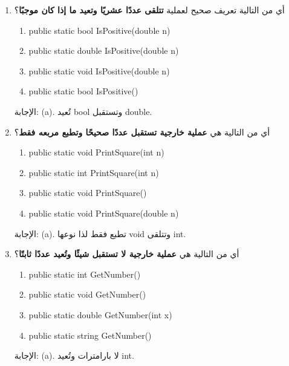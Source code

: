 \documentclass[14pt]{extarticle}
\begin{document}
\begin{enumerate}[itemsep=1.8em]

\clearpage
\item
أي من التالية تعريف صحيح لعملية \textbf{تتلقى عددًا عشريًا وتعيد ما إذا كان موجبًا}؟
\begin{english}
\begin{enumerate}[label=(\alph*)]
    \item public static bool IsPositive(double n)
    \item public static double IsPositive(double n)
    \item public static void IsPositive(double n)
    \item public static bool IsPositive()
\end{enumerate}
\end{english}
\ifwithsols
\begin{boxSolution}
الإجابة: (a).
تُعيد bool وتستقبل double.
\end{boxSolution}
\fi


\item
أي من التالية هي \textbf{عملية خارجية تستقبل عددًا صحيحًا وتطبع مربعه فقط}؟
\begin{english}
\begin{enumerate}[label=(\alph*)]
    \item public static void PrintSquare(int n)
    \item public static int PrintSquare(int n)
    \item public static void PrintSquare()
    \item public static void PrintSquare(double n)
\end{enumerate}
\end{english}
\ifwithsols
\begin{boxSolution}
الإجابة: (a).
تطبع فقط لذا نوعها void وتتلقى int.
\end{boxSolution}
\fi


\item
أي من التالية هي \textbf{عملية خارجية لا تستقبل شيئًا وتُعيد عددًا ثابتًا}؟
\begin{english}
\begin{enumerate}[label=(\alph*)]
    \item public static int GetNumber()
    \item public static void GetNumber()
    \item public static double GetNumber(int x)
    \item public static string GetNumber()
\end{enumerate}
\end{english}
\ifwithsols
\begin{boxSolution}
الإجابة: (a).
لا بارامترات وتُعيد int.
\end{boxSolution}
\fi


\end{enumerate}
\end{document}
